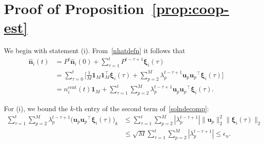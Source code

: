 \documentclass[final,5p,times,twocolumn]{elsarticle}
\theoremstyle{definition}
\begin{document}
\appendix



\section{Proof of Proposition~\ref{prop:coop-est}}\label{app:proof-prop1}
We begin with statement (i). 
From~\eqref{nhatdefn} it follows that
\begin{align}
\mathbf{\hat{n}}_i(t) & =P^t \mathbf{\hat{n}}_i(0) + \sum_{\tau = 1}^{t} P^{t-\tau+1} \boldsymbol{\xi}_i(\tau) \nonumber \\
&=\sum_{\tau = 0}^{t}  \Big[ \frac{1}{M} \mathbf{1}_M \mathbf{1}_M^\top \boldsymbol{\xi}_i(\tau) + \sum_{p=2}^{M} \lambda_p^{t-\tau+1} \mathbf{u}_p {\mathbf{u}_p}^\top \boldsymbol{\xi}_i(\tau) \Big] \nonumber\\
&=  n_i^{\text{cent}}(t) \mathbf{1}_M + \sum_{\tau = 1}^{t} \sum_{p=2}^{M} \lambda_p^{t-\tau+1} \mathbf{u}_p {\mathbf{u}_p}^\top \boldsymbol{\xi}_i(\tau). \label{solndecomp}
\end{align}

For (i), we bound the $k$-th entry of the second term of~\eqref{solndecomp}:
\begin{align}
\sum_{\tau = 1}^{t} \sum_{p=2}^M  \lambda_p^{t-\tau+1}  \big( \mathbf{u}_p {\mathbf{u}_p}^\top \boldsymbol{\xi}_i(\tau) \big)_k  \!
&\leq \!   \sum_{\tau = 1}^{t} \sum_{p=2}^M |\lambda_p^{t-\tau+1}| \| \mathbf{u}_p\|_2^2   \| \boldsymbol{\xi}_i(\tau) \|_2  \nonumber \\
& \leq   \sqrt{M} \sum_{\tau = 1}^{t} \sum_{p=2}^M  |\lambda_p^{t-\tau+1}| \le \epsilon_n.  \nonumber
\end{align}
\end{document}
